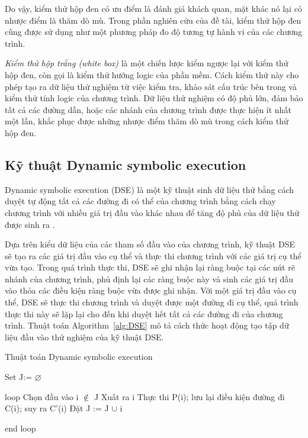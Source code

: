 Do vậy, kiểm thử hộp đen có ưu điểm là đánh giá khách quan, mặt khác
nó lại có nhược điểm là thăm dò mù. Trong phần nghiên cứu của đề tài,
kiểm thử hộp đen cũng được sử dụng như một phương pháp đo độ tương tự
hành vi của các chương trình.
		
\emph{Kiểm thử hộp trắng (white box)} là một chiến lược kiểm ngược lại
với kiểm thử hộp đen, còn gọi là kiểm thử hướng logic của phần
mềm. Cách kiểm thử này cho phép tạo ra dữ liệu thử nghiệm từ việc kiểm
tra, khảo sát cấu trúc bên trong và kiểm thử tính logic của chương
trình. Dữ liệu thử nghiệm có độ phủ lớn, đảm bảo tất cả các đường dẫn,
hoặc các nhánh của chương trình được thực hiện ít nhất một lần, khắc
phục được những nhược điểm thăm dò mù trong cách kiểm thử hộp đen.

\subsection{Kỹ thuật Dynamic symbolic execution}
\label{sec:dse}

Dynamic symbolic execution (DSE) là một kỹ thuật sinh dữ liệu thử bằng
cách duyệt tự động tất cả các đường đi có thể của chương trình bằng
cách chạy chương trình với nhiều giá trị đầu vào khác nhau để tăng độ
phủ của dữ liệu thử được sinh ra \cite{xie2009fitness}.

Dựa trên kiểu dữ liệu của các tham số đầu vào của chương trình, kỹ
thuật DSE sẽ tạo ra các giá trị đầu vào cụ thể và thực thi chương
trình với các giá trị cụ thể vừa tạo. Trong quá trình thực thi, DSE sẽ
ghi nhận lại ràng buộc tại các nút rẽ nhánh của chương trình, phủ định
lại các ràng buộc này và sinh các giá trị đầu vào thỏa các điều kiện
ràng buộc vừa được ghi nhận. Với một giá trị đầu vào cụ thể, DSE sẽ
thực thi chương trình và duyệt được một đường đi cụ thể, quá trình
thực thi này sẽ lặp lại cho đến khi duyệt hết tất cả các đường đi của
chương trình. Thuật toán Algorithm~\ref{alg:DSE} mô tả cách thức hoạt
động tạo tập dữ liệu đầu vào thử nghiệm của kỹ thuật DSE.

\begin{algorithm}
	\caption{Thuật toán Dynamic symbolic execution}
	\label{alg:DSE}
	\begin{algorithmic}
        \item Set J:= $\varnothing $ 
        \item loop \subitem Chọn đầu vào i $\notin $ J  \subitem Xuất ra i
          \subitem Thực thi P(i); lưu lại điều kiện đường đi C(i); suy
          ra C'(i) \subitem Đặt J := J $\cup $ i
        \item end loop
	\end{algorithmic}
\end{algorithm}

